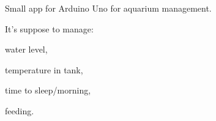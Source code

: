 Small app for Arduino Uno for aquarium management.

It's suppose to manage\+:
\begin{DoxyItemize}
\item water level,
\item temperature in tank,
\item time to sleep/morning,
\item feeding. 
\end{DoxyItemize}
